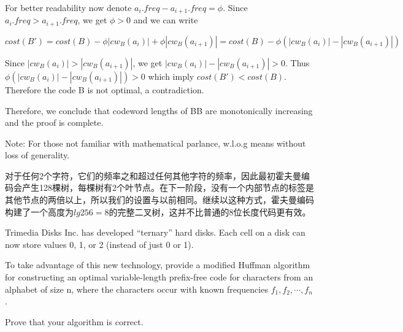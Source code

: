 \documentclass[a4paper, justified]{tufte-handout}
\begin{document}
\begin{solution}
	For better readability now denote $a_i.freq - a_{i + 1}$.$freq = \phi$. Since $a_i.freq > a_{i + 1}.freq$, we get $\phi > 0$ and we can write

	$$cost(B') = cost(B) - \phi|cw_B(a_i)| + \phi|cw_B(a_{i + 1})| = cost(B) - \phi(|cw_B(a_i)| - |cw_B(a_{i + 1})|)$$

	Since $|cw_B(a_i)| > |cw_B(a_{i + 1})|$, we get $|cw_B(a_i)| - |cw_B(a_{i + 1})| > 0$. Thus $\phi(|cw_B(a_i)| - |cw_B(a_{i + 1})|) > 0$ which imply $cost(B') < cost(B)$. Therefore the code B is not optimal, a contradiction.

	Therefore, we conclude that codeword lengths of BB are monotonically increasing and the proof is complete.

	Note: For those not familiar with mathematical parlance, w.l.o.g means without loss of generality.
\end{solution}

\begin{problem}[TC 16.3-8]
\end{problem}

\begin{solution}
	对于任何2个字符，它们的频率之和超过任何其他字符的频率，因此最初霍夫曼编码会产生128棵树，每棵树有2个叶节点。在下一阶段，没有一个内部节点的标签是其他节点的两倍以上，所以我们的设置与以前相同。继续以这种方式，霍夫曼编码构建了一个高度为$lg 256 = 8$的完整二叉树，这并不比普通的8位长度代码更有效。
\end{solution}


\beginoptional

\begin{problem}
\end{problem}

\begin{solution}
\end{solution}

\beginot
\begin{ot}
	Trimedia Disks Inc. has developed ``ternary'' hard disks.
	Each cell on a disk can now store values 0, 1, or 2 (instead of just 0 or 1).

	To take advantage of this new technology, provide a modified Huffman
	algorithm for constructing an optimal variable-length prefix-free code for characters from an alphabet of size n, where the characters occur with known frequencies $f_1, f_2, \cdots , f_n$.

	Prove that your algorithm is correct.
\end{ot}
\end{document}
